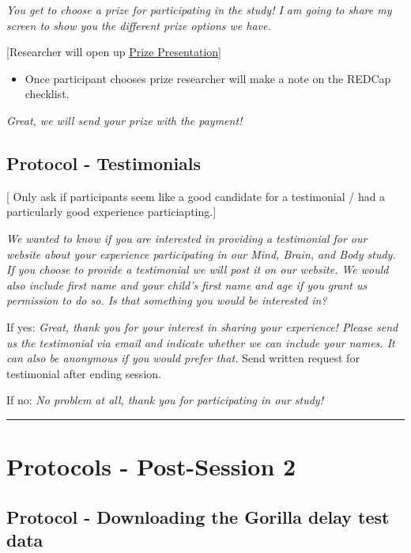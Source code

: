 \documentclass[]{book}
\providecommand{\tightlist}{%
  \setlength{\itemsep}{0pt}\setlength{\parskip}{0pt}}
\begin{document}
\emph{You get to choose a prize for participating in the study! I am going to share my screen to show you the different prize options we have.}

{[}Researcher will open up \href{https://app.box.com/file/780536035674}{Prize Presentation}{]}

\begin{itemize}
\tightlist
\item
  Once participant chooses prize researcher will make a note on the REDCap checklist.
\end{itemize}

\emph{Great, we will send your prize with the payment!}

\hypertarget{protocol---testimonials-1}{%
\subsection{Protocol - Testimonials}\label{protocol---testimonials-1}}

{[} Only ask if participants seem like a good candidate for a testimonial / had a particularly good experience particiapting.{]}

\emph{We wanted to know if you are interested in providing a testimonial for our website about your experience participating in our Mind, Brain, and Body study. If you choose to provide a testimonial we will post it on our website. We would also include first name and your child's first name and age if you grant us permission to do so. Is that something you would be interested in?}

If yes: \emph{Great, thank you for your interest in sharing your experience! Please send us the testimonial via email and indicate whether we can include your names. It can also be anonymous if you would prefer that.} Send written request for testimonial after ending session.

If no: \emph{No problem at all, thank you for participating in our study!}

\begin{center}\rule{0.5\linewidth}{0.5pt}\end{center}

\hypertarget{protocols---post-session-2-1}{%
\section{Protocols - Post-Session 2}\label{protocols---post-session-2-1}}

\hypertarget{protocol---downloading-the-gorilla-delay-test-data-1}{%
\subsection{Protocol - Downloading the Gorilla delay test data}\label{protocol---downloading-the-gorilla-delay-test-data-1}}
\end{document}
